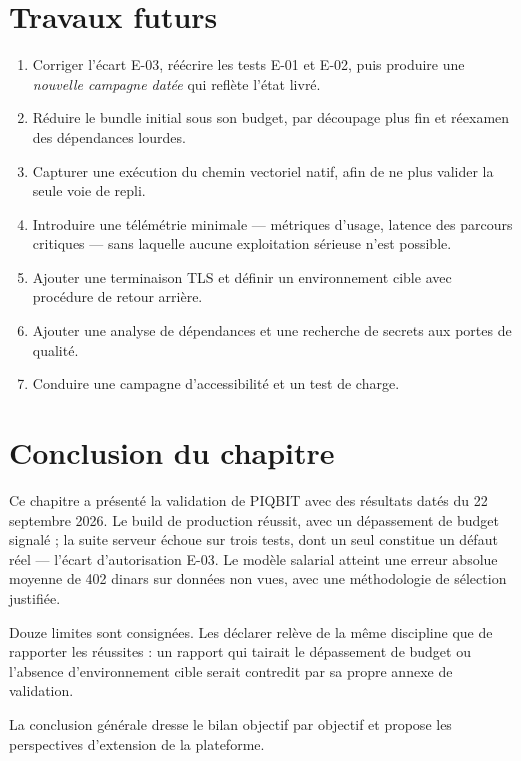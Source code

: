 \section{Travaux futurs}
\label{sec:future_work}

\begin{enumerate}[leftmargin=*]
  \item Corriger l'écart E-03, réécrire les tests E-01 et E-02, puis produire
        une \emph{nouvelle campagne datée} qui reflète l'état livré.
  \item Réduire le bundle initial sous son budget, par découpage plus fin et
        réexamen des dépendances lourdes.
  \item Capturer une exécution du chemin vectoriel natif, afin de ne plus
        valider la seule voie de repli.
  \item Introduire une télémétrie minimale — métriques d'usage, latence des
        parcours critiques — sans laquelle aucune exploitation sérieuse n'est
        possible.
  \item Ajouter une terminaison TLS et définir un environnement cible avec
        procédure de retour arrière.
  \item Ajouter une analyse de dépendances et une recherche de secrets aux
        portes de qualité.
  \item Conduire une campagne d'accessibilité et un test de charge.
\end{enumerate}

\section{Conclusion du chapitre}
\label{sec:val_conclusion}

Ce chapitre a présenté la validation de PIQBIT avec des résultats datés du
22 septembre 2026. Le build de production réussit, avec un dépassement de
budget signalé ; la suite serveur échoue sur trois tests, dont un seul
constitue un défaut réel — l'écart d'autorisation E-03. Le modèle salarial
atteint une erreur absolue moyenne de 402 dinars sur données non vues, avec une
méthodologie de sélection justifiée.

Douze limites sont consignées. Les déclarer relève de la même discipline que
de rapporter les réussites : un rapport qui tairait le dépassement de budget ou
l'absence d'environnement cible serait contredit par sa propre annexe de
validation.

La conclusion générale dresse le bilan objectif par objectif et propose les
perspectives d'extension de la plateforme.
